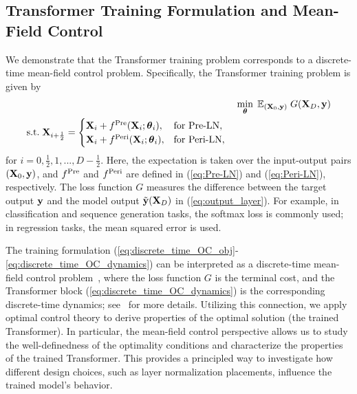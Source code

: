 \documentclass[journal]{IEEEtran}
\def\eqref#1{equation~\ref{#1}}
\newcommand{\bfX}{{\bf X}}
\newcommand{\bfy}{ {\bf y}}
\newcommand{\bftheta}{{\boldsymbol \theta}}
\renewcommand{\eqref}[1]{(\ref{#1})}
\theoremstyle{plain}
\theoremstyle{definition}
\theoremstyle{remark}
\begin{document}
\subsection{Transformer Training Formulation and Mean-Field Control}\label{sec:OC_formulation}
We demonstrate that the Transformer training problem corresponds to a discrete-time mean-field control problem. Specifically, the Transformer training problem is given by
\begin{align}\label{eq:discrete_time_OC_obj}
    & \min_{\bftheta} \; \mathbb{E}_{(\bfX_0, \bfy)} \; G(\bfX_D, \bfy) \\ 
    \begin{split} &\text{s.t.} \; \bfX_{i+\frac{1}{2}} = 
    \begin{cases}\label{eq:discrete_time_OC_dynamics}
    \bfX_i + f^{\rm Pre}(\bfX_{i}; \bftheta_i), & \text{for Pre-LN},\\
    \bfX_i + f^{\rm Peri}(\bfX_i; \bftheta_{i}), & \text{for Peri-LN},
    \end{cases}
\end{split}
\end{align}
for $i=0,\frac{1}{2},1,...,D-\frac{1}{2}$.
Here, the expectation is taken over the input-output pairs $(\bfX_0, \bfy)$, and $f^{\rm Pre}$ and $f^{\rm Peri}$ are defined in \eqref{eq:Pre-LN} and \eqref{eq:Peri-LN}, respectively. The loss function $G$ measures the difference between the target output $\bfy$ and the model output $\tilde{\bfy}(\bfX_D)$ in (\ref{eq:output_layer}). For example, in classification and sequence generation tasks, the softmax loss is commonly used; in regression tasks, the mean squared error is used. 

The training formulation (\ref{eq:discrete_time_OC_obj}-\ref{eq:discrete_time_OC_dynamics}) can be interpreted as a discrete-time mean-field control problem~\cite{bensoussan2013mean}, where the loss function $G$ is the terminal cost, and the Transformer block (\ref{eq:discrete_time_OC_dynamics}) is the corresponding discrete-time dynamics; see~ for more details.
Utilizing this connection, we apply optimal control theory to derive properties of the optimal solution (the trained Transformer). In particular, the mean-field control perspective allows us to study the well-definedness of the optimality conditions and characterize 
the properties of the trained Transformer. This provides a principled way to investigate how different design choices, such as layer normalization placements, influence the trained model’s behavior.
\end{document}
